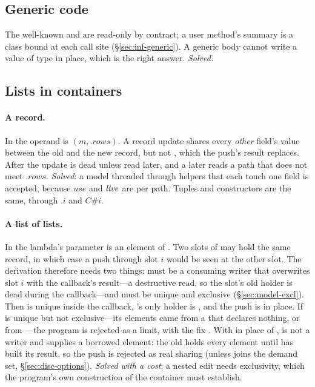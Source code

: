 \subsection{Generic code}
\label{sec:hard-generic}

The well-known  and  are read-only by contract; a user method's summary is a
class bound at each call site (\S\ref{sec:inf-generic}). A generic body cannot write a value of type
 in place, which is the right answer. \emph{Solved.}

\subsection{Lists in containers}
\label{sec:hard-containers}

\paragraph{A record.} In  the operand is $(m, .\mathit{rows})$.
A record update shares every \emph{other} field's value between the old and the new record, but not
, which the push's result replaces. After the update  is dead unless read later,
and a later  reads a path that does not meet $.\mathit{rows}$. \emph{Solved}: a model
threaded through helpers that each touch one field is accepted, because $\mathit{use}$ and $\mathit{live}$ are
per path. Tuples and constructors are the same, through $.i$ and $C\#i$.

\paragraph{A list of lists.} In  the
lambda's parameter is an element of . Two slots of  may hold the same record, in
which case a push through slot $i$ would be seen at the other slot. The derivation therefore needs two
things:  must be a consuming writer that overwrites slot $i$ with the callback's
result---a destructive read, so the slot's old holder is dead during the callback---and  must
be unique and exclusive (\S\ref{sec:model-excl}). Then  is unique inside the callback,
's only holder is , and the push is in place. If  is unique but not
exclusive---its elements came from a  that declares nothing, or from
---the program is rejected as a limit, with the fix . With
 in place of ,  is not a writer and supplies a borrowed element: the old
 holds every element until  has built its result, so the push is rejected as real
sharing (unless  joins the demand set, \S\ref{sec:disc-options}). \emph{Solved with a cost}:
a nested edit needs exclusivity, which the program's own construction of the container must establish.


